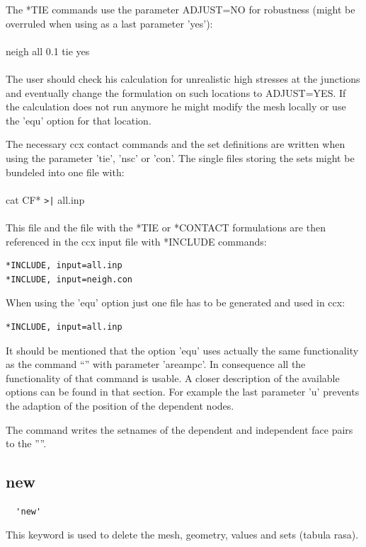 \documentclass{article}
\begin{document}
The *TIE commands use the parameter ADJUST=NO for robustness (might be overruled when using as a last parameter 'yes'):\\\\ neigh all 0.1 tie yes\\\\The user should check his calculation for unrealistic high stresses at the junctions and eventually change the formulation on such locations to ADJUST=YES. If the calculation does not run anymore he might modify the mesh locally or use the 'equ' option for that location.

The necessary ccx contact commands and the set definitions are written when using the parameter 'tie', 'nsc' or 'con'. The single files storing the sets might be bundeled into one file with:\\\\cat CF* \verb_>|_ all.inp\\\\This file and the file with the *TIE or *CONTACT formulations are then referenced in the ccx input file with *INCLUDE commands:
\begin{verbatim}
*INCLUDE, input=all.inp
*INCLUDE, input=neigh.con
\end{verbatim}
When using the 'equ' option just one file has to be generated and used in ccx:
\begin{verbatim}
*INCLUDE, input=all.inp
\end{verbatim}

It should be mentioned that the option 'equ' uses actually the same functionality as the command ``'' with parameter 'areampc'. In consequence all the functionality of that command is usable. A closer description of the available options can be found in that section. For example the last parameter 'u' prevents the adaption of the position of the dependent nodes.

The command writes the setnames of the dependent and independent face pairs to the ''''.

\subsection{\label{new}new}
\begin{verbatim}
  'new'
\end{verbatim}
This keyword is used to delete the mesh, geometry, values and sets (tabula rasa).
\end{document}
